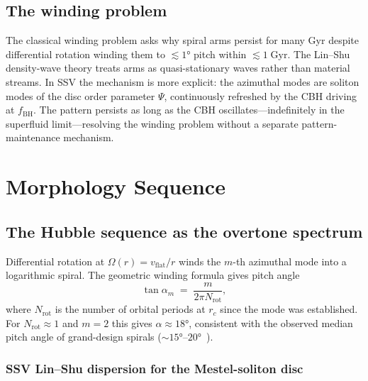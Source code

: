 \documentclass[11pt,a4paper]{article}
\begin{document}
\subsection{The winding problem}

The classical winding problem asks why spiral arms persist for many Gyr despite
differential rotation winding them to $\lesssim1°$ pitch within $\lesssim1\;\mathrm{Gyr}$.
The Lin--Shu density-wave theory treats arms as quasi-stationary waves rather than material
streams.  In SSV the mechanism is more explicit: the azimuthal modes are soliton modes of
the disc order parameter $\Psi$, continuously refreshed by the CBH driving at
$f_\mathrm{BH}$.  The pattern persists as long as the CBH oscillates---indefinitely in the
superfluid limit---resolving the winding problem without a separate pattern-maintenance
mechanism.

\section{Morphology Sequence}
\label{sec:morphology}

\subsection{The Hubble sequence as the overtone spectrum}

Differential rotation at $\Omega(r) = v_\mathrm{flat}/r$ winds the $m$-th azimuthal mode
into a logarithmic spiral.  The geometric winding formula gives pitch angle
\begin{equation}
  \tan\alpha_m \;=\; \frac{m}{2\pi N_\mathrm{rot}},
  \label{eq:pitch}
\end{equation}
where $N_\mathrm{rot}$ is the number of orbital periods at $r_c$ since the mode was
established.  For $N_\mathrm{rot}\approx1$ and $m=2$ this gives
$\alpha \approx 18°$, consistent with the observed median pitch angle of grand-design
spirals ($\sim15°$--$20°$~\cite{davis2012}).

\subsubsection*{SSV Lin--Shu dispersion for the Mestel-soliton disc}
\label{sec:pitch_dispersion}
\end{document}
